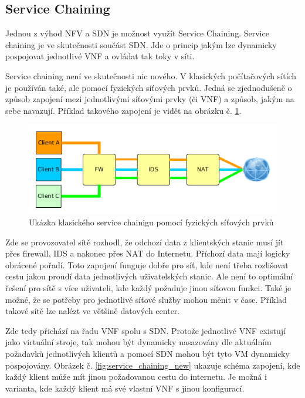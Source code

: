 \subsection{Service Chaining} \label{sub:SDN}

Jednou z výhod NFV a SDN je možnost využít Service Chaining. Service chaining je ve skutečnosti součást SDN. Jde o princip jakým lze dynamicky pospojovat jednotlivé VNF a ovládat tak toky v síti. \cite{NFV_simplified}

Service chaining není ve skutečnosti nic nového. V klasických počítačových sítích je používán také, ale pomocí fyzických síťových prvků. Jedná se zjednodušeně o způsob zapojení mezi jednotlivými síťovými prvky (či VNF) a způsob, jakým na sebe navazují. Příklad takového zapojení je vidět na obrázku č. \ref{fig:service_chaining}. 

\begin{figure}[h]
\begin{centering}
\includegraphics[scale=0.6]{images/service_chaining}
\par\end{centering}
\caption{Ukázka klasického service chainigu pomocí fyzických síťových prvků\label{fig:service_chaining}}
\end{figure}

Zde se provozovatel sítě rozhodl, že odchozí data z klientských stanic musí jít přes firewall, IDS a nakonec přes NAT do Internetu. Příchozí data mají logicky obrácené pořadí. Toto zapojení funguje dobře pro síť, kde není třeba rozlišovat cestu jakou proudí data jednotlivých uživatelských stanic. Ale není to optimální řešení pro sítě s více uživateli, kde každý požaduje jinou síťovou funkci. Také je možné, že se potřeby pro jednotlivé síťové služby mohou měnit v čase. Příklad takové sítě lze nalézt ve většině datových center. 

Zde tedy přichází na řadu VNF spolu s SDN. Protože jednotlivé VNF existují jako virtuální stroje, tak mohou být dynamicky nasazovány dle aktuálním požadavků jednotlivých klientů a pomocí SDN mohou být tyto VM dynamicky pospojovány. Obrázek č. \ref{fig:service_chaining_new} ukazuje schéma zapojení, kde každý klient může mít jinou požadovanou cestu do internetu. Je možná i varianta, kde každý klient má své vlastní VNF s jinou konfigurací.

